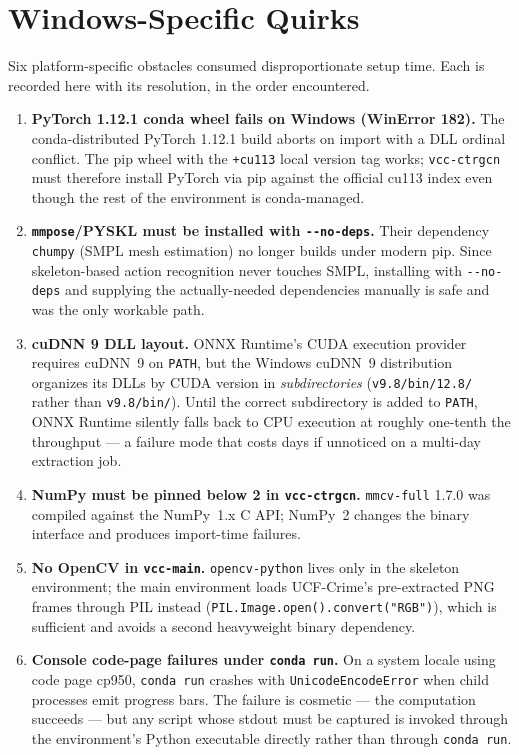 \section{Windows-Specific Quirks}
\label{sec:appd-windows}

Six platform-specific obstacles consumed disproportionate setup time. Each is
recorded here with its resolution, in the order encountered.

\begin{enumerate}
    \item \textbf{PyTorch 1.12.1 conda wheel fails on Windows (WinError 182).}
    The conda-distributed PyTorch 1.12.1 build aborts on import with a DLL
    ordinal conflict. The pip wheel with the \texttt{+cu113} local version tag
    works; \texttt{vcc-ctrgcn} must therefore install PyTorch via pip against
    the official cu113 index even though the rest of the environment is
    conda-managed.
    \item \textbf{\texttt{mmpose}/PYSKL must be installed with
    \texttt{-{}-no-deps}.} Their dependency \texttt{chumpy} (SMPL mesh
    estimation) no longer builds under modern pip. Since skeleton-based
    action recognition never touches SMPL, installing with
    \texttt{-{}-no-deps} and supplying the actually-needed dependencies
    manually is safe and was the only workable path.
    \item \textbf{cuDNN 9 DLL layout.} ONNX Runtime's CUDA execution provider
    requires cuDNN~9 on \texttt{PATH}, but the Windows cuDNN~9 distribution
    organizes its DLLs by CUDA version in \emph{subdirectories}
    (\texttt{v9.8/bin/12.8/} rather than \texttt{v9.8/bin/}). Until the
    correct subdirectory is added to \texttt{PATH}, ONNX Runtime silently
    falls back to CPU execution at roughly one-tenth the throughput --- a
    failure mode that costs days if unnoticed on a multi-day extraction job.
    \item \textbf{NumPy must be pinned below 2 in \texttt{vcc-ctrgcn}.}
    \texttt{mmcv-full} 1.7.0 was compiled against the NumPy~1.x C API;
    NumPy~2 changes the binary interface and produces import-time failures.
    \item \textbf{No OpenCV in \texttt{vcc-main}.} \texttt{opencv-python}
    lives only in the skeleton environment; the main environment loads
    UCF-Crime's pre-extracted PNG frames through PIL instead
    (\texttt{PIL.Image.open().convert("RGB")}), which is sufficient and
    avoids a second heavyweight binary dependency.
    \item \textbf{Console code-page failures under \texttt{conda run}.} On a
    system locale using code page cp950, \texttt{conda run} crashes with
    \texttt{UnicodeEncodeError} when child processes emit progress bars. The
    failure is cosmetic --- the computation succeeds --- but any script whose
    stdout must be captured is invoked through the environment's Python
    executable directly rather than through \texttt{conda run}.
\end{enumerate}

